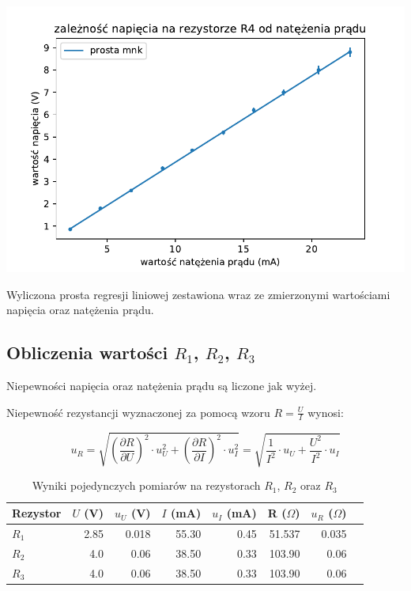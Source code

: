\documentclass[a4paper]{article}
\begin{document}
\begin{table}
\centering
\includegraphics[scale=0.7]{fig_d.pdf}
\caption{Wyliczona prosta regresji liniowej zestawiona wraz ze zmierzonymi wartościami napięcia oraz natężenia prądu.}
\end{table}

\subsection{Obliczenia wartości $R_1$, $R_2$, $R_3$}

Niepewności napięcia oraz natężenia prądu są liczone jak wyżej.

Niepewność rezystancji wyznaczonej za pomocą wzoru $R = \frac{U}{I}$ wynosi:

$$u_R = \sqrt{(\frac{\partial R}{\partial U})^2 \cdot u_U^2 + (\frac{\partial R}{\partial I})^2 \cdot u_I^2} = \sqrt{\frac{1}{I^2} \cdot u_U + \frac{U^2}{I^2} \cdot u_I}$$

\begin{table}
\centering
\begin{tabular}{lrrrrrrl}
\toprule
Rezystor &  $U$ (V) &  $u_U$ (V) &  $I$ (mA) &  $u_I$ (mA) &  R ($\Omega$) &  $u_R$ ($\Omega$) \\
\midrule
$R_1$ &          2.85 &           0.018 &                  55.30 &              0.45 &             51.537 &             0.035 \\
$R_2$ &          4.0 &           0.06 &                  38.50 &              0.33 &            103.90 &             0.06 \\
$R_3$ &          4.0 &           0.06 &                  38.50 &              0.33 &            103.90 &             0.06 \\
\bottomrule
\end{tabular}
\caption{Wyniki pojedynczych pomiarów na rezystorach $R_1$, $R_2$ oraz $R_3$}
\end{table}
\end{document}
